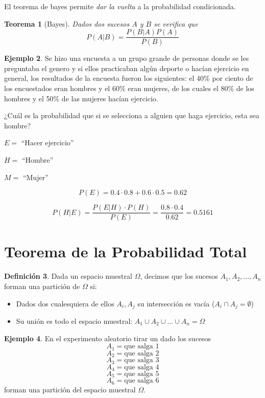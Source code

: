 \documentclass[]{book}
\providecommand{\tightlist}{%
  \setlength{\itemsep}{0pt}\setlength{\parskip}{0pt}}
\theoremstyle{plain}
\newtheorem{theorem}{Teorema}[section]
\theoremstyle{definition}
\newtheorem{definition}[theorem]{Definición}
\newtheorem{example}[theorem]{Ejemplo}
\theoremstyle{definition} %
\begin{document}
El teorema de bayes permite \emph{dar la vuelta} a la probabilidad
condicionada.

\begin{theorem}[Bayes]
  Dados dos sucesos \(A\) y \(B\) se verifica que 
  \[P(A|B) = \frac{P(B|A)P(A)}{P(B)}\]
\end{theorem}
 

\begin{example}
Se hizo una encuesta a un grupo grande de personas donde se les
preguntaba el genero y si ellos practicaban algún deporte o hacían
ejercicio en general, los resultados de la encuesta fueron los
siguientes: el 40\% por ciento de los encuestados eran hombres y el 60\%
eran mujeres, de los cuales el 80\% de los hombres y el 50\% de las
mujeres hacían ejercicio.

¿Cuál es la probabilidad que si se selecciona a alguien que haga
ejercicio, esta sea hombre?

\(E =\) ``Hacer ejercicio''

\(H =\) ``Hombre''

\(M =\) ``Mujer''

\[P(E) = 0.4\cdot 0.8 + 0.6 \cdot 0.5 = 0.62\]

\[P(H|E) = \frac{P(E|H)\cdot P(H)}{P(E)}=\frac{0.8\cdot 0.4}{0.62}=0.5161\]
 
\end{example}



\section{Teorema de la Probabilidad Total} 

\begin{definition}
Dada un espacio muestral \(\Omega\), decimos que
los sucesos \(A_1, A_2, \ldots, A_n\) forman una partición de \(\Omega\)
si:

\begin{itemize}
\tightlist
\item
  Dados dos cualesquiera de ellos \(A_i, A_j\) su intersección es vacía
  (\(A_i\cap A_j = \emptyset\))
\item
  Su unión es todo el espacio muestral:
  \(A_1 \cup A_2 \cup \ldots \cup A_n = \Omega\)
\end{itemize}
\end{definition}


\begin{example}
  En el experimento aleatorio tirar un dado los sucesos
\[A_1 = \text{que salga 1}\] 
\[A_2 = \text{que salga 2}\]
\[A_3 = \text{que salga 3}\] 
\[A_4 = \text{que salga 4}\]
\[A_5 = \text{que salga 5}\] 
\[A_6 = \text{que salga 6}\] 
forman
una partición del espacio muestral \(\Omega\).

\end{example}
 
\end{document}
